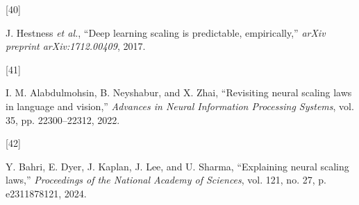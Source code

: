 \documentclass[
  10pt,
]{article}
\newlength{\cslhangindent}
\newlength{\csllabelwidth}
\newenvironment{CSLReferences}[2] %
 {\begin{list}{}{%
  \setlength{\itemindent}{0pt}
  \setlength{\leftmargin}{0pt}
  \setlength{\parsep}{0pt}
  \ifodd #1
   \setlength{\leftmargin}{\cslhangindent}
   \setlength{\itemindent}{-1\cslhangindent}
  \fi
  \setlength{\itemsep}{#2\baselineskip}}}
 {\end{list}}
\newcommand{\CSLLeftMargin}[1]{\parbox[t]{\csllabelwidth}{\strut#1\strut}}
\newcommand{\CSLRightInline}[1]{\parbox[t]{\linewidth - \csllabelwidth}{\strut#1\strut}}
\begin{document}
\begin{CSLReferences}{0}{0}
\CSLLeftMargin{{[}40{]} }%
\CSLRightInline{J. Hestness \emph{et al.}, {``Deep learning scaling is
predictable, empirically,''} \emph{arXiv preprint arXiv:1712.00409},
2017.}

\CSLLeftMargin{{[}41{]} }%
\CSLRightInline{I. M. Alabdulmohsin, B. Neyshabur, and X. Zhai,
{``Revisiting neural scaling laws in language and vision,''}
\emph{Advances in Neural Information Processing Systems}, vol. 35, pp.
22300--22312, 2022.}

\CSLLeftMargin{{[}42{]} }%
\CSLRightInline{Y. Bahri, E. Dyer, J. Kaplan, J. Lee, and U. Sharma,
{``Explaining neural scaling laws,''} \emph{Proceedings of the National
Academy of Sciences}, vol. 121, no. 27, p. e2311878121, 2024.}

\end{CSLReferences}
\end{document}
